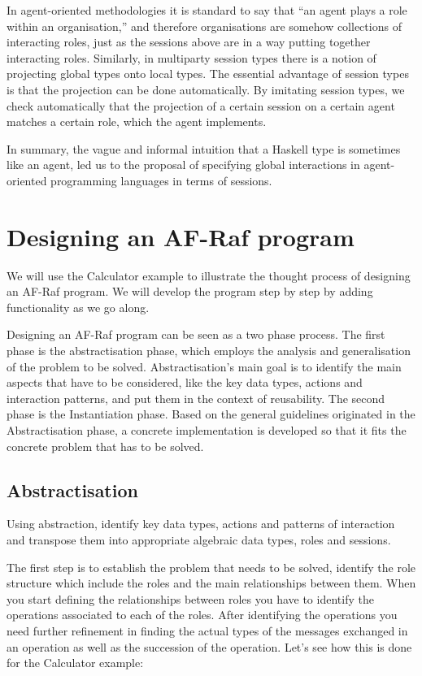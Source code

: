 \documentclass[a4paper,12pt,oneside,fleqn]{book} %
\newcommand{\todo}[1]{[\textcolor{red}{TODO}: #1]}
\begin{document}
{In agent-oriented methodologies it is standard to say that ``an agent plays
a role within an organisation,'' and therefore organisations are somehow
collections of interacting roles, just as the sessions above are in a way
putting together interacting roles. Similarly, in multiparty session types
there is a notion of projecting global types onto local types. The
essential advantage of session types is that the projection can be done
automatically. By imitating session types, we check automatically that the
projection of a certain session on a certain agent matches a certain role,
which the agent implements.

In summary, the vague and informal intuition that a Haskell type is
sometimes like an agent, led us to the proposal of specifying global
interactions in agent-oriented programming languages in terms of sessions.

\section{Designing an AF-Raf program} %
We will use the Calculator example to illustrate the thought process of
designing an AF-Raf program. We will develop the program step by step by
adding functionality as we go along.

Designing an AF-Raf program can be seen as a two phase process. The first
phase is the abstractisation phase, which employs the analysis and
generalisation of the problem to be solved. Abstractisation's main goal is to
identify the main aspects that have to be considered, like the key data
types, actions and interaction patterns, and put them in the context of
reusability. The second phase is the Instantiation phase. Based on the
general guidelines originated in the Abstractisation phase, a concrete
implementation is developed so that it fits the concrete problem that has
to be solved.
\subsection{Abstractisation} %
Using abstraction, identify key data types, actions and patterns of
interaction and transpose them into appropriate algebraic data types, roles
and sessions.

The first step is to establish the problem that needs to be solved, identify
the role structure which include the roles and the main relationships
between them. When you start defining the relationships between roles you
have to identify the operations associated to each of the roles. After
identifying the operations you need further refinement in finding the
actual types of the messages exchanged in an operation as well as the
succession of the operation. Let's see how this is done for the Calculator
example:

}
\end{document}

